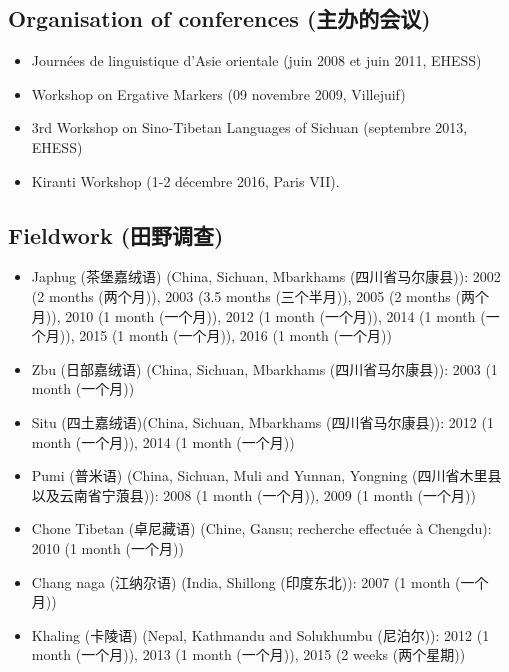 \documentclass[oldfontcommands,oneside,a4paper,11pt]{article}
\newcommand{\zh}[1]{{\cn #1}}
\newcommand{\lingua}[3]{#2 (\zh{#3})}
\begin{document}
\subsection*{\lingua{Conférences organisées}{Organisation of conferences}{主办的会议}}
\begin{itemize}
\item Journées de linguistique d'Asie orientale (juin 2008 et juin 2011, EHESS)
\item Workshop on Ergative Markers (09 novembre 2009, Villejuif)
\item 3rd Workshop on Sino-Tibetan Languages of Sichuan (septembre 2013, EHESS)
\item Kiranti Workshop (1-2 décembre 2016, Paris VII).
\end{itemize}

\newcommand{\deuxsemaines}{\lingua{2 semaines}{2 weeks}{两个星期}}
\newcommand{\unmois}{\lingua{1 mois}{1 month}{一个月}}
\newcommand{\deuxmois}{\lingua{2 mois}{2 months}{两个月}}
\newcommand{\troismois}{\lingua{3 mois et demi}{3.5 months}{三个半月}}
\subsection*{\lingua{Séjours de terrain}{Fieldwork}{田野调查}}
\begin{itemize}
\item   \lingua{Japhug}{Japhug}{茶堡嘉绒语} (\lingua{Chine, Sichuan, Mbarkhams}{China, Sichuan, Mbarkhams}{四川省马尔康县}): 2002 (\deuxmois{}), 2003 (\troismois{}), 2005 (\deuxmois{}), 2010 (\unmois{}), 2012 (\unmois{}), 2014 (\unmois{}), 2015 (\unmois{}), 2016 (\unmois{})
\item  \lingua{Zbu}{Zbu}{日部嘉绒语} (\lingua{Chine, Sichuan, Mbarkhams}{China, Sichuan, Mbarkhams}{四川省马尔康县}): 2003 (\unmois{})
\item  \lingua{Situ}{Situ}{四土嘉绒语}(\lingua{Chine, Sichuan, Mbarkhams}{China, Sichuan, Mbarkhams}{四川省马尔康县}): 2012 (\unmois{}), 2014 (\unmois{})
\item  \lingua{Pumi}{Pumi}{普米语} (\lingua{Chine, Sichuan, Muli et Yunnan, Yongning}{China, Sichuan, Muli and Yunnan, Yongning}{四川省木里县以及云南省宁蒗县}): 2008 (\unmois{}), 2009 (\unmois{})
\item  \lingua{Tibétain de Tchoné}{Chone Tibetan}{卓尼藏语} (Chine, Gansu; recherche effectuée à Chengdu): 2010 (\unmois{})
\item   \lingua{Chang naga}{Chang naga}{江纳尕语} (\lingua{Inde, Shillong}{India, Shillong}{印度东北}): 2007 (\unmois{})
\item  \lingua{Khaling}{Khaling}{卡陵语} (\lingua{Népal, Kathmandu et Solukhumbu}{Nepal, Kathmandu and Solukhumbu}{尼泊尔}): 2012 (\unmois{}), 2013 (\unmois{}), 2015 (\deuxsemaines{})
  \end{itemize}
  
\end{document}
